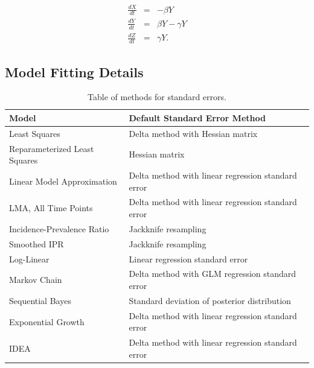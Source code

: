 \documentclass[12pt]{article}
\newcommand{\rr}{\ensuremath{\mathcal{R}_0}}
\begin{document}
\begin{eqnarray*}
	\frac{dX}{dt} &=& -\beta Y \\
	\frac{dY}{dt} &=& \beta Y - \gamma Y \\
	\frac{dZ}{dt} &=& \gamma Y.
\end{eqnarray*}


	
	
	
	
	
	
	
	
	


\subsection{Model Fitting Details}\label{sec:model-fit}

\begin{table}[H]
	\centering
	\begin{tabular}{@{}ll@{}}
		\toprule
		\textbf{Model} & \textbf{Default Standard Error Method} \\ \midrule
		Least Squares & Delta method with Hessian matrix\\
		Reparameterized Least Squares & Hessian matrix \\
		Linear Model Approximation & Delta method with linear regression standard error \\
		LMA, All Time Points & Delta method with linear regression standard error \\
		Incidence-Prevalence Ratio & Jackknife resampling \\
		Smoothed IPR & Jackknife resampling \\
		Log-Linear & Linear regression standard error \\
		Markov Chain & Delta method with GLM regression standard error \\
		Sequential Bayes & Standard deviation of posterior distribution\\
		Exponential Growth & Delta method with linear regression standard error \\
		IDEA & Delta method with linear regression standard error \\
		\bottomrule
	\end{tabular}
	\caption{Table of methods for standard errors.}
	\label{tab:se-methods}
\end{table}
\end{document}
